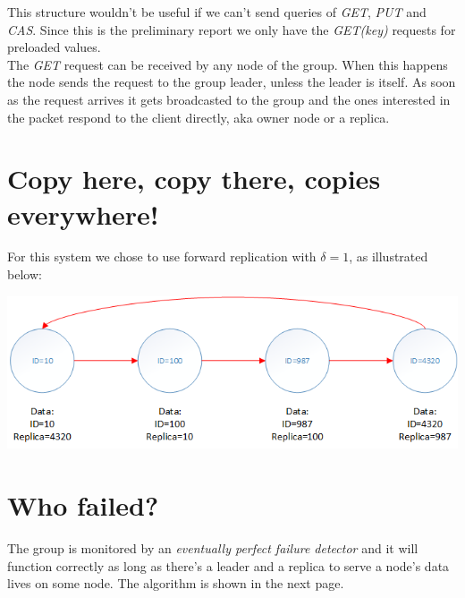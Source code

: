 \documentclass[a4paper, 11pt]{article}
\begin{document}
\noindent This structure wouldn't be useful if we can't send queries of \textit{GET}, \textit{PUT} and \textit{CAS}. Since this is the preliminary report we only have the \textit{GET(key)} requests for preloaded values. \\
\noindent The \textit{GET} request can be received by any node of the group. When this happens the node sends the request to the group leader, unless the leader is itself. As soon as the request arrives it gets broadcasted to the group and the ones interested in the packet respond to the client directly, aka owner node or a replica.

\section{Copy here, copy there, copies everywhere!}

\noindent For this system we chose to use forward replication with $\delta = 1$, as illustrated below: 

{\centering\includegraphics[scale = 0.8]{./figures/replication.png}\par}


\section{Who failed?}

\noindent The group is monitored by an \textit{eventually perfect failure detector} and it will function correctly as long as there's a leader and a replica to serve a node's data lives on some node. The algorithm is shown in the next page.
\end{document}
